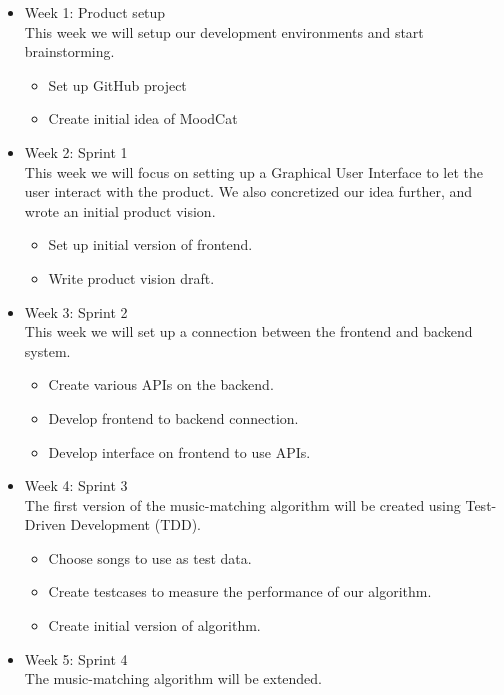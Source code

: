 \begin{itemize}
\item Week 1: Product setup\\
This week we will setup our development environments and start brainstorming.

\begin{itemize}
\item Set up GitHub project \cite{githubRepo}
\item Create initial idea of MoodCat
\end{itemize}

\item Week 2: Sprint 1\\
This week we will focus on setting up a Graphical User Interface to let the user interact with the product.
We also concretized our idea further, and wrote an initial product vision.

\begin{itemize}
\item Set up initial version of frontend.
\item Write product vision draft.
\end{itemize}

\item Week 3: Sprint 2\\
This week we will set up a connection between the frontend and backend system.

\begin{itemize}
\item Create various APIs on the backend.
\item Develop frontend to backend connection.
\item Develop interface on frontend to use APIs.
\end{itemize}

\item Week 4: Sprint 3\\
The first version of the music-matching algorithm will be created using Test-Driven Development (TDD)\cite{TDD}.

\begin{itemize}
\item Choose songs to use as test data.
\item Create testcases to measure the performance of our algorithm.
\item Create initial version of algorithm.
\end{itemize}

\item Week 5: Sprint 4\\
The music-matching algorithm will be extended.


\end{itemize}
